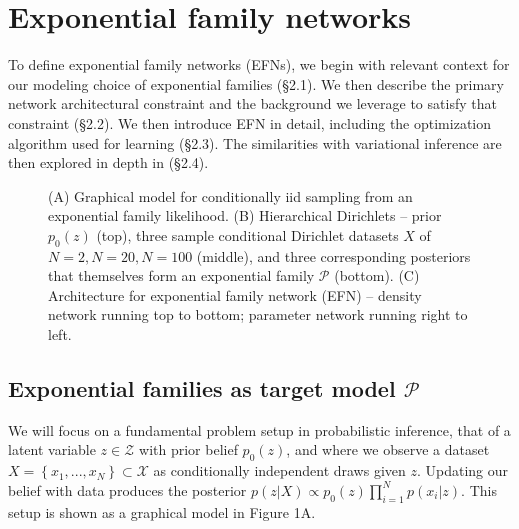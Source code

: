 \documentclass[twoside]{article}
\newcommand{\inputTikZ}[2]{%
     \scalebox{#1}{}  
}
\begin{document}
\section{Exponential family networks}

To define exponential family networks (EFNs), we begin with relevant context for our modeling choice of exponential families (\S2.1).  We then describe the primary network architectural constraint and the background we leverage to satisfy that constraint (\S2.2). We then introduce EFN in detail, including the optimization algorithm used for learning (\S2.3).  The similarities with variational inference are then explored in depth in (\S2.4).

\begin{figure}
 {\centering \inputTikZ{0.55}{figs/fig1/efn1b.tex}  }


  \caption{(A) Graphical model for conditionally iid sampling from an exponential family likelihood.  (B) Hierarchical Dirichlets -- prior $p_0(z)$ (top), three sample conditional Dirichlet datasets $X$ of $N=2, N=20, N=100$ (middle), and three corresponding posteriors that themselves form an exponential family $\mathcal{P}$ (bottom).  (C) Architecture for exponential family network (EFN) -- density network running top to bottom; parameter network running right to left.}
\end{figure}

\subsection{Exponential families as target model $\mathcal{P}$}

We will focus on a fundamental problem setup in probabilistic inference, that of a latent variable $z \in \mathcal{Z}$ with prior belief $p_0(z)$, and where we observe a dataset $X = \left\{x_1,...,x_N\right\} \subset \mathcal{X}$ as conditionally independent draws given $z$.   Updating our belief with data produces the posterior $p(z | X) \propto p_0(z) \prod_{i=1}^N p(x_i | z)$.  This setup is shown as a graphical model in Figure 1A.
\end{document}
